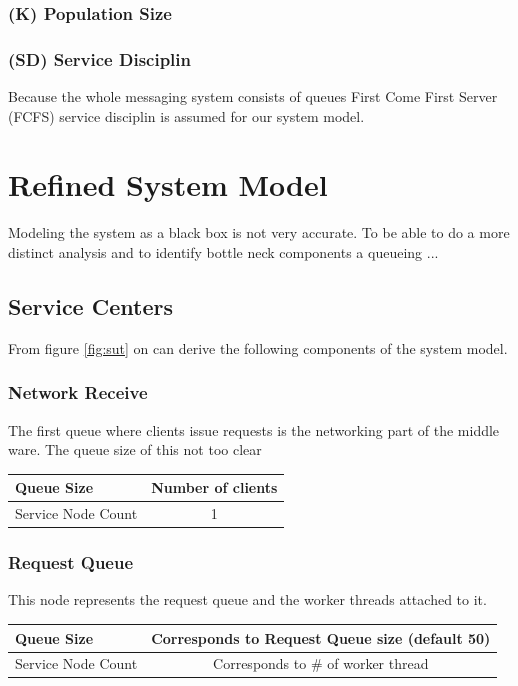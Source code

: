 \documentclass[a4paper]{article}
\begin{document}
\subsubsection{(K) Population Size}


\subsubsection{(SD) Service Disciplin}
Because the whole messaging system consists of queues  First Come First Server (FCFS) service disciplin is assumed for our system model.


\section{Refined System Model}

Modeling the system as a black box is not very accurate. To be able to do a more distinct analysis and to identify bottle neck components a queueing ...

\subsection{Service Centers}

From figure \ref{fig:sut} on can derive the following components of the system model.

\subsubsection{Network Receive}
The first queue where clients issue requests is the networking part of the middle ware. The queue size of this not too clear \\

\begin{tabular}{|l|c|}
\hline 
Queue Size & Number of clients \\ 
\hline 
Service Node Count & 1 \\ 
\hline 
\end{tabular} 

\subsubsection{Request Queue}
This node represents the request queue and the worker threads attached to it.\\

\begin{tabular}{|l|c|}
\hline 
Queue Size & Corresponds to Request Queue size (default 50)\\ 
\hline 
Service Node Count & Corresponds to \# of worker thread \\ 
\hline 
\end{tabular} 
\end{document}
